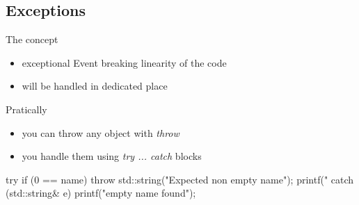 \subsection[Exceptions]{Exceptions}

\begin{frame}[fragile]
  \begin{block}{The concept}
    \begin{itemize}
    \item exceptional Event breaking linearity of the code
    \item will be handled in dedicated place
    \end{itemize}
  \end{block}
  \begin{block}{Pratically}
    \begin{itemize}
    \item you can throw any object with {\it throw}
    \item you handle them using {\it try ... catch} blocks
    \end{itemize}
  \end{block}
  \begin{cppcode}
    try {
      if (0 == name) {
        throw std::string("Expected non empty name");
      }
      printf("%
    } catch (std::string& e) {
      printf("empty name found\n");      
    }
  \end{cppcode}
\end{frame}

